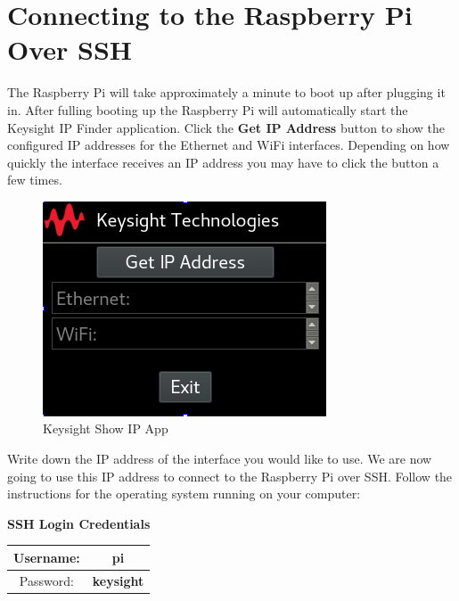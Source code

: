 \documentclass{article}
\begin{document}
\section{Connecting to the Raspberry Pi Over SSH}

The Raspberry Pi will take approximately a minute to boot up after plugging it in. After fulling booting up the Raspberry Pi will automatically start the Keysight IP Finder application. Click the \textbf{Get IP Address} button to show the configured IP addresses for the Ethernet and WiFi interfaces. Depending on how quickly the interface receives an IP address you may have to click the button a few times.

	\begin{figure}[H]
		\centering
		\includegraphics[scale=0.75]{pics/Show_IP_app.png}
		\caption{Keysight Show IP App}
		\label{Show_IP_app}
	\end{figure}

Write down the IP address of the interface you would like to use. We are now going to use this IP address to connect to the Raspberry Pi over SSH. Follow the instructions for the operating system running on your computer:

	\begin{center}
		\textbf{SSH Login Credentials}
	\end{center}
	\begin{center}
		\begin{tabular}{| c | c |}
			\hline
			Username: & \textbf{pi} \\
			\hline
			Password: & \textbf{keysight} \\
			\hline
		\end{tabular}
	\end{center}
\end{document}
